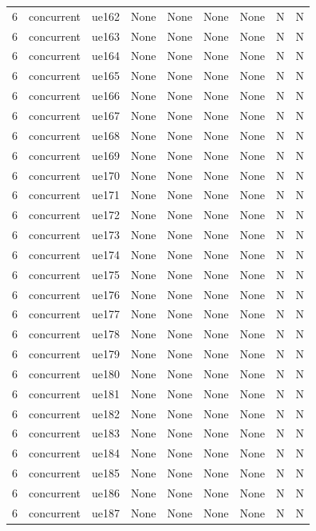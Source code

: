 \begin{table}[ht]
\begin{tabular}{|c|c|c|c|c|c|c|c|c|}
6 & concurrent & ue162 & None & None & None & None & N & N \\
6 & concurrent & ue163 & None & None & None & None & N & N \\
6 & concurrent & ue164 & None & None & None & None & N & N \\
6 & concurrent & ue165 & None & None & None & None & N & N \\
6 & concurrent & ue166 & None & None & None & None & N & N \\
6 & concurrent & ue167 & None & None & None & None & N & N \\
6 & concurrent & ue168 & None & None & None & None & N & N \\
6 & concurrent & ue169 & None & None & None & None & N & N \\
6 & concurrent & ue170 & None & None & None & None & N & N \\
6 & concurrent & ue171 & None & None & None & None & N & N \\
6 & concurrent & ue172 & None & None & None & None & N & N \\
6 & concurrent & ue173 & None & None & None & None & N & N \\
6 & concurrent & ue174 & None & None & None & None & N & N \\
6 & concurrent & ue175 & None & None & None & None & N & N \\
6 & concurrent & ue176 & None & None & None & None & N & N \\
6 & concurrent & ue177 & None & None & None & None & N & N \\
6 & concurrent & ue178 & None & None & None & None & N & N \\
6 & concurrent & ue179 & None & None & None & None & N & N \\
6 & concurrent & ue180 & None & None & None & None & N & N \\
6 & concurrent & ue181 & None & None & None & None & N & N \\
6 & concurrent & ue182 & None & None & None & None & N & N \\
6 & concurrent & ue183 & None & None & None & None & N & N \\
6 & concurrent & ue184 & None & None & None & None & N & N \\
6 & concurrent & ue185 & None & None & None & None & N & N \\
6 & concurrent & ue186 & None & None & None & None & N & N \\
6 & concurrent & ue187 & None & None & None & None & N & N \\

\end{tabular}
\end{table}
